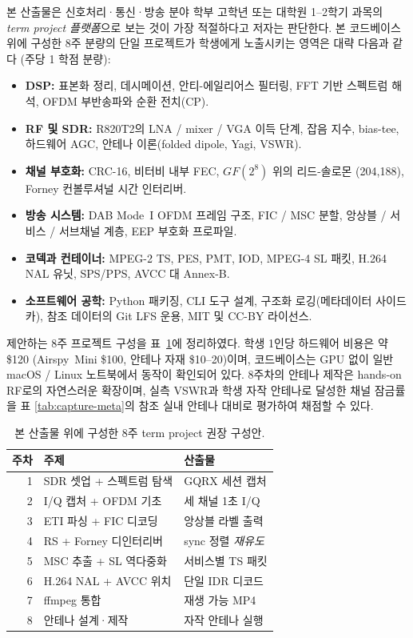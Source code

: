 \documentclass[11pt,a4paper]{article}
\begin{document}
본 산출물은 신호처리·통신·방송 분야 학부 고학년 또는 대학원 1--2학기
과목의 \emph{term project 플랫폼}으로 보는 것이 가장 적절하다고
저자는 판단한다.  본 코드베이스 위에 구성한 8주 분량의 단일
프로젝트가 학생에게 노출시키는 영역은 대략 다음과 같다 (주당 1
학점 분량):

\begin{itemize}[leftmargin=*,nosep]
\item \textbf{DSP:} 표본화 정리, 데시메이션, 안티-에일리어스 필터링,
       FFT 기반 스펙트럼 해석, OFDM 부반송파와 순환 전치(CP).
\item \textbf{RF 및 SDR:} R820T2의 LNA / mixer / VGA 이득 단계,
       잡음 지수, bias-tee, 하드웨어 AGC, 안테나 이론(folded
       dipole, Yagi, VSWR).
\item \textbf{채널 부호화:} CRC-16, 비터비 내부 FEC, $GF(2^8)$ 위의
       리드-솔로몬 (204,188), Forney 컨볼루셔널 시간 인터리버.
\item \textbf{방송 시스템:} DAB Mode~I OFDM 프레임 구조, FIC / MSC
       분할, 앙상블 / 서비스 / 서브채널 계층, EEP 부호화 프로파일.
\item \textbf{코덱과 컨테이너:} MPEG-2 TS, PES, PMT, IOD, MPEG-4 SL
       패킷, H.264 NAL 유닛, SPS/PPS, AVCC 대 Annex-B.
\item \textbf{소프트웨어 공학:} Python 패키징, CLI 도구 설계, 구조화
       로깅(메타데이터 사이드카), 참조 데이터의 Git LFS 운용, MIT
       및 CC-BY 라이선스.
\end{itemize}

제안하는 8주 프로젝트 구성을 표~\ref{tab:syllabus}에 정리하였다.
학생 1인당 하드웨어 비용은 약 \$120 (Airspy~Mini \$100, 안테나 자재
\$10--20)이며, 코드베이스는 GPU 없이 일반 macOS / Linux 노트북에서
동작이 확인되어 있다.  8주차의 안테나 제작은 hands-on RF로의 자연스러운
확장이며, 실측 VSWR과 학생 자작 안테나로 달성한 채널 잠금률을 표
\ref{tab:capture-meta}의 참조 실내 안테나 대비로 평가하여 채점할 수 있다.

\begin{table}[t]
\centering
\caption{본 산출물 위에 구성한 8주 term project 권장 구성안.}
\label{tab:syllabus}
\begin{tabular}{rlp{4.6cm}}
\toprule
주차 & 주제 & 산출물 \\
\midrule
1 & SDR 셋업 + 스펙트럼 탐색       & GQRX 세션 캡처 \\
2 & I/Q 캡처 + OFDM 기초           & 세 채널 1초 I/Q \\
3 & ETI 파싱 + FIC 디코딩          & 앙상블 라벨 출력 \\
4 & RS + Forney 디인터리버         & sync 정렬 \emph{재유도} \\
5 & MSC 추출 + SL 역다중화         & 서비스별 TS 패킷 \\
6 & H.264 NAL + AVCC 위치          & 단일 IDR 디코드 \\
7 & ffmpeg 통합                    & 재생 가능 MP4 \\
8 & 안테나 설계·제작                & 자작 안테나 실행 \\
\bottomrule
\end{tabular}
\end{table}
\end{document}
